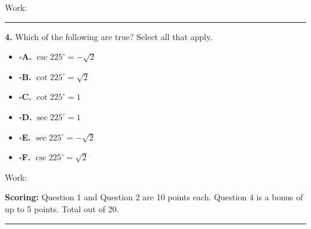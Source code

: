 \documentclass[11pt]{article}
\newcommand{\checkbox}{$\square$\;}
\begin{document}
\vspace{4pt}
Work:

\vspace{2.5cm}

\noindent\rule{\textwidth}{0.4pt}

\vspace{6pt}
\textbf{4.} Which of the following are true? Select all that apply.

\vspace{4pt}
\begin{minipage}[t]{0.45\textwidth}
\begin{itemize}[leftmargin=1.2em, itemsep=7pt]
\item[] \checkbox \textbf{A.} $\csc225^\circ=-\sqrt2$
\item[] \checkbox \textbf{B.} $\cot225^\circ=\sqrt2$
\item[] \checkbox \textbf{C.} $\cot225^\circ=1$
\end{itemize}
\end{minipage}\hfill
\begin{minipage}[t]{0.45\textwidth}
\begin{itemize}[leftmargin=1.2em, itemsep=7pt]
\item[] \checkbox \textbf{D.} $\sec225^\circ=1$
\item[] \checkbox \textbf{E.} $\sec225^\circ=-\sqrt2$
\item[] \checkbox \textbf{F.} $\csc225^\circ=\sqrt2$
\end{itemize}
\end{minipage}

\vspace{6pt}
Work:

\vfill
\noindent\textbf{Scoring:} Question 1 and Question 2 are 10 points each. Question 4 is a bonus of up to 5 points. Total out of 20.

\newpage
{}

\vspace{4pt}\noindent\rule{\textwidth}{0.6pt}
\end{document}
